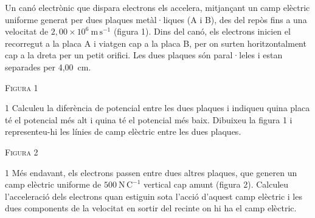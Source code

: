 Un canó electrònic que dispara electrons els accelera, mitjançant un camp elèctric uniforme generat per dues plaques metàl·liques (A i B), des del repòs fins a una velocitat de $2,00\times 10^{6}\ \mathrm{m\,s^{-1}}$ (figura 1). Dins del canó, els electrons inicien el recorregut a la placa A i viatgen cap a la placa B, per on surten horitzontalment cap a la dreta per un petit orifici. Les dues plaques són paral·leles i estan separades per 4,00~cm.

{\centering \textsc{Figura 1}\par}

\begin{apartat}{1}
Calculeu la diferència de potencial entre les dues plaques i indiqueu quina placa té el potencial més alt i quina té el potencial més baix. Dibuixeu la figura 1 i representeu-hi les línies de camp elèctric entre les dues plaques.
\end{apartat}

{\centering \textsc{Figura 2}\par}

\begin{apartat}{1}
Més endavant, els electrons passen entre dues altres plaques, que generen un camp elèctric uniforme de $500\ \mathrm{N\,C^{-1}}$ vertical cap amunt (figura 2). Calculeu l'acceleració dels electrons quan estiguin sota l'acció d'aquest camp elèctric i les dues components de la velocitat en sortir del recinte on hi ha el camp elèctric.
\end{apartat}

